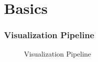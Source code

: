 \section{Basics}

\begin{frame}
	\frametitle{Visualization Pipeline}
	\begin{figure}
	    \centering
	    \caption{Visualization Pipeline}
	    \label{fig:visPipeline}
	\end{figure}
\end{frame}

